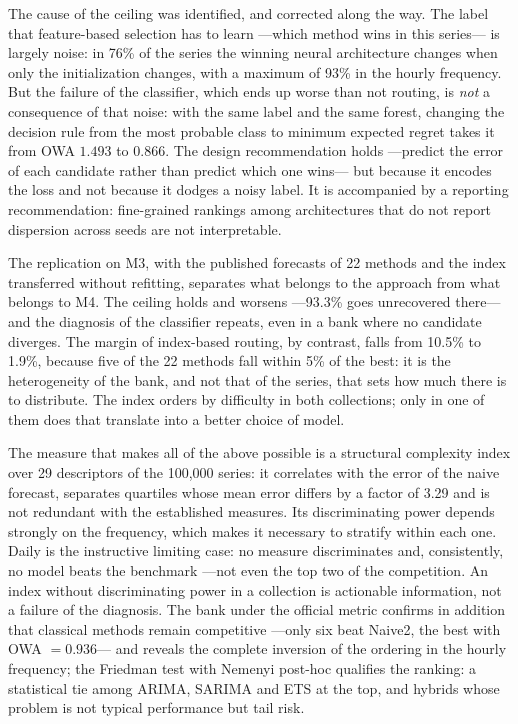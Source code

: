 The cause of the ceiling was identified, and corrected along the way. The label that
feature-based selection has to learn ---which method wins in this series--- is largely
noise: in 76\% of the series the winning neural architecture changes when only the
initialization changes, with a maximum of 93\% in the hourly frequency. But the failure of
the classifier, which ends up worse than not routing, is \emph{not} a consequence of that
noise: with the same label and the same forest, changing the decision rule from the most
probable class to minimum expected regret takes it from OWA $1.493$ to $0.866$. The design
recommendation holds ---predict the error of each candidate rather than predict which one
wins--- but because it encodes the loss and not because it dodges a noisy label. It is
accompanied by a reporting recommendation: fine-grained rankings among architectures that
do not report dispersion across seeds are not interpretable.

The replication on M3, with the published forecasts of 22 methods and the index
transferred without refitting, separates what belongs to the approach from what belongs to
M4. The ceiling holds and worsens ---93.3\% goes unrecovered there--- and the diagnosis of
the classifier repeats, even in a bank where no candidate diverges. The margin of
index-based routing, by contrast, falls from 10.5\% to 1.9\%, because five of the 22
methods fall within 5\% of the best: it is the heterogeneity of the bank, and not that of
the series, that sets how much there is to distribute. The index orders by difficulty in
both collections; only in one of them does that translate into a better choice of model.

The measure that makes all of the above possible is a structural complexity index over 29
descriptors of the 100{,}000 series: it correlates with the error of the naive forecast,
separates quartiles whose mean error differs by a factor of 3.29 and is not redundant with
the established measures. Its discriminating power depends strongly on the frequency,
which makes it necessary to stratify within each one. Daily is the instructive limiting
case: no measure discriminates and, consistently, no model beats the benchmark ---not even
the top two of the competition. An index without discriminating power in a collection is
actionable information, not a failure of the diagnosis. The bank under the official metric
confirms in addition that classical methods remain competitive ---only six beat Naive2,
the best with OWA $=0.936$--- and reveals the complete inversion of the ordering in the
hourly frequency; the Friedman test with Nemenyi post-hoc qualifies the ranking: a
statistical tie among ARIMA, SARIMA and ETS at the top, and hybrids whose problem is not
typical performance but tail risk.

